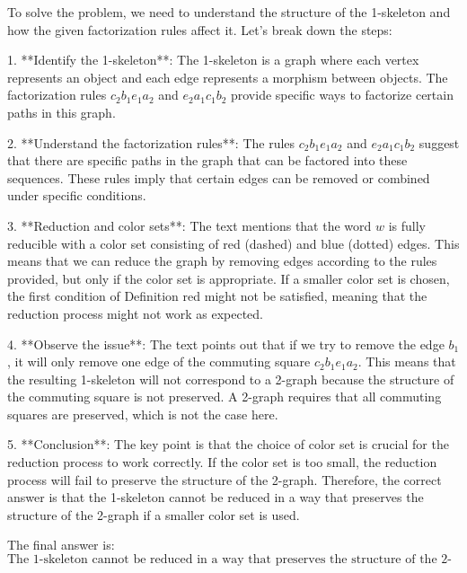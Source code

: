 To solve the problem, we need to understand the structure of the 1-skeleton and how the given factorization rules affect it. Let's break down the steps:

1. **Identify the 1-skeleton**: The 1-skeleton is a graph where each vertex represents an object and each edge represents a morphism between objects. The factorization rules \( c_2 b_1 e_1 a_2 \) and \( e_2 a_1 c_1 b_2 \) provide specific ways to factorize certain paths in this graph.

2. **Understand the factorization rules**: The rules \( c_2 b_1 e_1 a_2 \) and \( e_2 a_1 c_1 b_2 \) suggest that there are specific paths in the graph that can be factored into these sequences. These rules imply that certain edges can be removed or combined under specific conditions.

3. **Reduction and color sets**: The text mentions that the word \( w \) is fully reducible with a color set consisting of red (dashed) and blue (dotted) edges. This means that we can reduce the graph by removing edges according to the rules provided, but only if the color set is appropriate. If a smaller color set is chosen, the first condition of Definition red might not be satisfied, meaning that the reduction process might not work as expected.

4. **Observe the issue**: The text points out that if we try to remove the edge \( b_1 \), it will only remove one edge of the commuting square \( c_2 b_1 e_1 a_2 \). This means that the resulting 1-skeleton will not correspond to a 2-graph because the structure of the commuting square is not preserved. A 2-graph requires that all commuting squares are preserved, which is not the case here.

5. **Conclusion**: The key point is that the choice of color set is crucial for the reduction process to work correctly. If the color set is too small, the reduction process will fail to preserve the structure of the 2-graph. Therefore, the correct answer is that the 1-skeleton cannot be reduced in a way that preserves the structure of the 2-graph if a smaller color set is used.

The final answer is:
\[
\boxed{\text{The 1-skeleton cannot be reduced in a way that preserves the structure of the 2-graph if a smaller color set is used.}}
\]